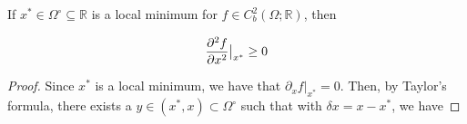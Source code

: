 \begin{theorem}
    
    If $x^* \in \Omega^\circ \subseteq \mathbb{R}$ is a local minimum for $f\in C^2_b(\Omega;\mathbb{R})$, then

    \begin{equation}
        \pdv[2]{f}{x}\big|_{x^*} \ge 0
    \end{equation}
    
    \begin{proof}
        Since $x^*$ is a local minimum, we have that $\partial_xf|_{x^*} = 0$. Then, by Taylor's formula, there exists a $y\in (x^*,x)\subset \Omega^\circ$ such that with $\delta x = x-x^*$, we have 
    \end{proof}

\end{theorem}